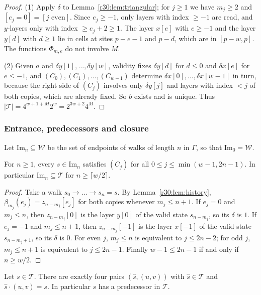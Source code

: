 \begin{proof}
(1) Apply $\delta$ to Lemma~\ref{r30:lem:triangular}; for $j\ge1$ we have $m_j\ge2$ and $[e_j=0]=[j\text{ even}]$. Since $e_j\ge-1$, only layers with index $\ge-1$ are read, and $y$-layers only with index $\ge e_j+2\ge1$. The layer $x[e]$ with $e\ge-1$ and the layer $y[d]$ with $d\ge1$ lie in cells at sites $p-e-1$ and $p-d$, which are in $[p-w,p]$. The functions $\Phi_{m,e}$ do not involve $M$.

(2) Given $a$ and $\delta y[1],\dots,\delta y[w]$, validity fixes $\delta y[d]$ for $d\le0$ and $\delta x[e]$ for $e\le-1$, and $(C_0),(C_1),\dots,(C_{w-1})$ determine $\delta x[0],\dots,\delta x[w-1]$ in turn, because the right side of $(C_j)$ involves only $\delta y[j]$ and layers with index $<j$ of both copies, which are already fixed. So $b$ exists and is unique. Thus $|\mathcal{T}|=4^{w+1+M}2^w=2^{3w+2}4^M$.
\end{proof}

\subsubsection*{Entrance, predecessors and closure}
Let $\mathrm{Im}_n\subseteq\mathcal{W}$ be the set of endpoints of walks of length $n$ in $\Gamma$, so that $\mathrm{Im}_0=\mathcal{W}$.

\begin{lemma}\label{r30:lem:entrance}
For $n\ge1$, every $s\in\mathrm{Im}_n$ satisfies $(C_j)$ for all $0\le j\le\min(w-1,2n-1)$. In particular $\mathrm{Im}_n\subseteq\mathcal{T}$ for $n\ge\lceil w/2\rceil$.
\end{lemma}

\begin{proof}
Take a walk $s_0\to\dots\to s_n=s$. By Lemma~\ref{r30:lem:history}, $\beta_{m_j}(e_j)=z_{n-m_j}[e_j]$ for both copies whenever $m_j\le n+1$. If $e_j=0$ and $m_j\le n$, then $z_{n-m_j}[0]$ is the layer $y[0]$ of the valid state $s_{n-m_j}$, so its $\delta$ is $1$. If $e_j=-1$ and $m_j\le n+1$, then $z_{n-m_j}[-1]$ is the layer $x[-1]$ of the valid state $s_{n-m_j+1}$, so its $\delta$ is $0$. For even $j$, $m_j\le n$ is equivalent to $j\le2n-2$; for odd $j$, $m_j\le n+1$ is equivalent to $j\le2n-1$. Finally $w-1\le2n-1$ if and only if $n\ge w/2$.
\end{proof}

\begin{lemma}\label{r30:lem:pred}
Let $s\in\mathcal{T}$. There are exactly four pairs $(\hat s,(u,v))$ with $\hat s\in\mathcal{T}$ and $\hat s\cdot(u,v)=s$. In particular $s$ has a predecessor in $\mathcal{T}$.
\end{lemma}

